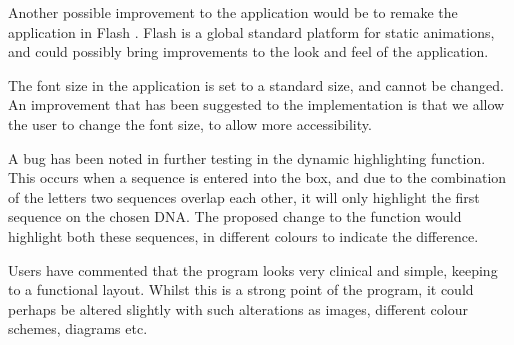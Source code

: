 Another possible improvement to the application would be to remake the application in Flash \cite{Flash}. Flash is a global standard platform for static animations, and could possibly bring improvements to the look and feel of the application. 

The font size in the application is set to a standard size, and cannot be changed. An improvement that has been suggested to the implementation is that we allow the user to change the font size, to allow more accessibility.

A bug has been noted in further testing in the dynamic highlighting function. This occurs when a sequence is entered into the box, and due to the combination of the letters two sequences overlap each other, it will only highlight the first sequence on the chosen DNA. The proposed change to the function would highlight both these sequences, in different colours to indicate the difference.

Users have commented that the program looks very clinical and simple, keeping to a functional layout. Whilst this is a strong point of the program, it could perhaps be altered slightly with such alterations as images, different colour schemes, diagrams etc.













